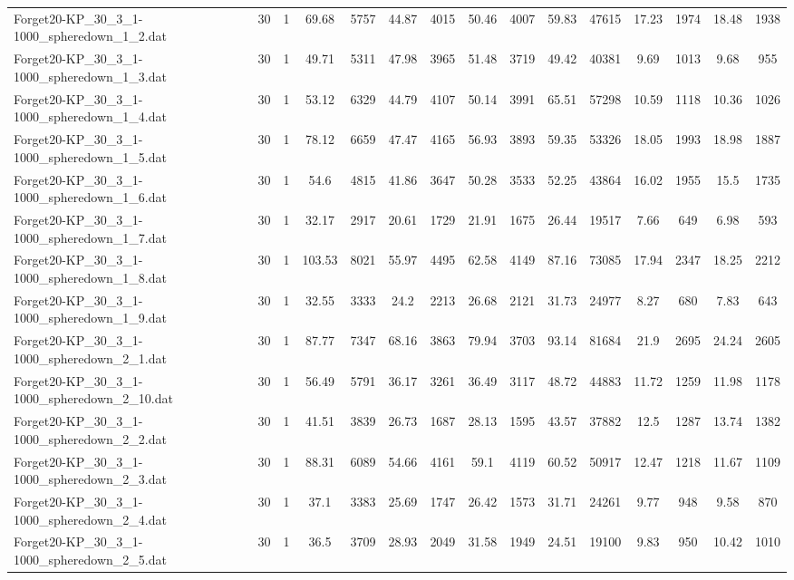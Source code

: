 \begin{table}[!ht]
{\begin{tabular}{lcccccccccccccc}
Forget20-KP\_30\_3\_1-1000\_spheredown\_1\_2.dat & 30 & 1 & 69.68 & 5757 & 44.87 & 4015 & 50.46 & 4007 & 59.83 & 47615 & 17.23 & 1974 & 18.48 & 1938 \\
Forget20-KP\_30\_3\_1-1000\_spheredown\_1\_3.dat & 30 & 1 & 49.71 & 5311 & 47.98 & 3965 & 51.48 & 3719 & 49.42 & 40381 & 9.69 & 1013 & 9.68 & 955 \\
Forget20-KP\_30\_3\_1-1000\_spheredown\_1\_4.dat & 30 & 1 & 53.12 & 6329 & 44.79 & 4107 & 50.14 & 3991 & 65.51 & 57298 & 10.59 & 1118 & 10.36 & 1026 \\
Forget20-KP\_30\_3\_1-1000\_spheredown\_1\_5.dat & 30 & 1 & 78.12 & 6659 & 47.47 & 4165 & 56.93 & 3893 & 59.35 & 53326 & 18.05 & 1993 & 18.98 & 1887 \\
Forget20-KP\_30\_3\_1-1000\_spheredown\_1\_6.dat & 30 & 1 & 54.6 & 4815 & 41.86 & 3647 & 50.28 & 3533 & 52.25 & 43864 & 16.02 & 1955 & 15.5 & 1735 \\
Forget20-KP\_30\_3\_1-1000\_spheredown\_1\_7.dat & 30 & 1 & 32.17 & 2917 & 20.61 & 1729 & 21.91 & 1675 & 26.44 & 19517 & 7.66 & 649 & 6.98 & 593 \\
Forget20-KP\_30\_3\_1-1000\_spheredown\_1\_8.dat & 30 & 1 & 103.53 & 8021 & 55.97 & 4495 & 62.58 & 4149 & 87.16 & 73085 & 17.94 & 2347 & 18.25 & 2212 \\
Forget20-KP\_30\_3\_1-1000\_spheredown\_1\_9.dat & 30 & 1 & 32.55 & 3333 & 24.2 & 2213 & 26.68 & 2121 & 31.73 & 24977 & 8.27 & 680 & 7.83 & 643 \\
Forget20-KP\_30\_3\_1-1000\_spheredown\_2\_1.dat & 30 & 1 & 87.77 & 7347 & 68.16 & 3863 & 79.94 & 3703 & 93.14 & 81684 & 21.9 & 2695 & 24.24 & 2605 \\
Forget20-KP\_30\_3\_1-1000\_spheredown\_2\_10.dat & 30 & 1 & 56.49 & 5791 & 36.17 & 3261 & 36.49 & 3117 & 48.72 & 44883 & 11.72 & 1259 & 11.98 & 1178 \\
Forget20-KP\_30\_3\_1-1000\_spheredown\_2\_2.dat & 30 & 1 & 41.51 & 3839 & 26.73 & 1687 & 28.13 & 1595 & 43.57 & 37882 & 12.5 & 1287 & 13.74 & 1382 \\
Forget20-KP\_30\_3\_1-1000\_spheredown\_2\_3.dat & 30 & 1 & 88.31 & 6089 & 54.66 & 4161 & 59.1 & 4119 & 60.52 & 50917 & 12.47 & 1218 & 11.67 & 1109 \\
Forget20-KP\_30\_3\_1-1000\_spheredown\_2\_4.dat & 30 & 1 & 37.1 & 3383 & 25.69 & 1747 & 26.42 & 1573 & 31.71 & 24261 & 9.77 & 948 & 9.58 & 870 \\
Forget20-KP\_30\_3\_1-1000\_spheredown\_2\_5.dat & 30 & 1 & 36.5 & 3709 & 28.93 & 2049 & 31.58 & 1949 & 24.51 & 19100 & 9.83 & 950 & 10.42 & 1010 \\

\end{tabular}}
\end{table}
